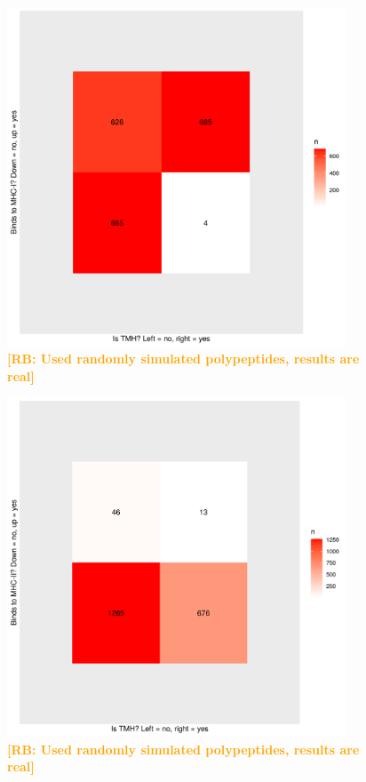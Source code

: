 \documentclass{article}
\newcommand{\richel}[1]{\textcolor{orange}{\textbf{[RB: #1]}}}
\begin{document}
\begin{figure}[!htbp]
  \includegraphics[width=0.9\textwidth]{p_bind_per_hydrophobicity/is_tmh_vs_binds_mhc1.png}
  \caption{
    \richel{Used randomly simulated polypeptides, results are real}
  }
  \label{fig:is_tmh_vs_binds_mhc1}
\end{figure}

\begin{figure}[!htbp]
  \includegraphics[width=0.9\textwidth]{p_bind_per_hydrophobicity/is_tmh_vs_binds_mhc2.png}
  \caption{
    \richel{Used randomly simulated polypeptides, results are real}
  }
  \label{fig:is_tmh_vs_binds_mhc2}
\end{figure}
\end{document}
